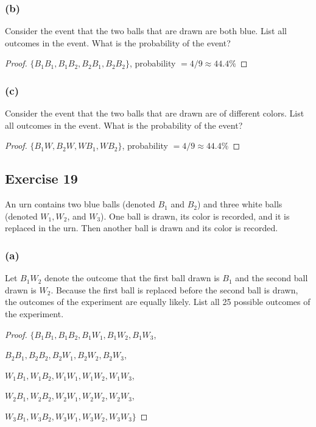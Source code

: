\documentclass[14pt]{extarticle}
\begin{document}
\subsubsection{(b)}
Consider the event that the two balls that are drawn are both blue. List all outcomes in the event. 
What is the probability of the event?

\begin{proof}
\(\{B_1B_1, B_1B_2, B_2B_1, B_2B_2\}\), probability \(= 4/9 \approx 44.4\%\)
\end{proof}

\subsubsection{(c)}
Consider the event that the two balls that are drawn are of different colors. List all outcomes in the event. 
What is the probability of the event?

\begin{proof}
\(\{B_1W, B_2W, WB_1, WB_2\}\), probability \(= 4/9 \approx 44.4\%\)
\end{proof}

\subsection{Exercise 19}
An urn contains two blue balls (denoted \(B_1\) and \(B_2\)) and three white balls (denoted \(W_1, W_2\), and 
\(W_3\)). One ball is drawn, its color is recorded, and it is replaced in the urn. Then another ball is drawn and its 
color is recorded.

\subsubsection{(a)}
Let \(B_1 W_2\) denote the outcome that the first ball drawn is \(B_1\) and the second ball drawn is \(W_2\). 
Because the first ball is replaced before the second ball is drawn, the outcomes of the experiment are equally 
likely. List all 25 possible outcomes of the experiment.

\begin{proof}
\(\{B_1B_1, B_1B_2, B_1W_1, B_1W_2, B_1W_3\), 

\(B_2B_1, B_2B_2, B_2W_1, B_2W_2, B_2W_3\), 

\(W_1B_1, W_1B_2, W_1W_1, W_1W_2, W_1W_3\), 

\(W_2B_1, W_2B_2, W_2W_1, W_2W_2, W_2W_3\), 

\(W_3B_1, W_3B_2, W_3W_1, W_3W_2, W_3W_3\}\)
\end{proof}
\end{document}

